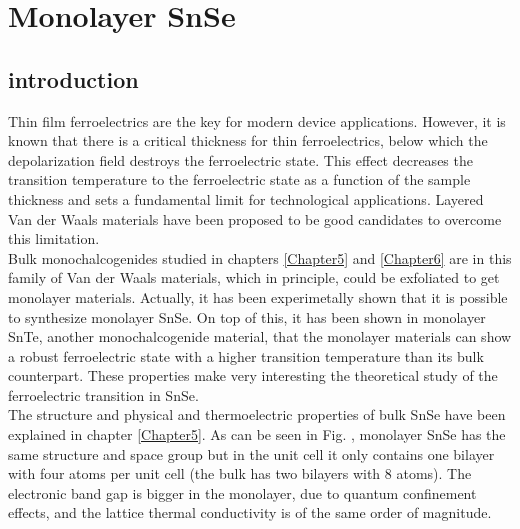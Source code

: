 
\chapter{Monolayer SnSe} %

\label{Chapter7} %




\section{introduction}

Thin film ferroelectrics are the key for modern device applications\cite{lallart2011ferroelectrics}. However, it is 
known that there is a critical thickness for thin ferroelectrics, below which the depolarization field destroys the 
ferroelectric state\cite{batra1973new,zhong1994giant,dawber2005physics}. This effect decreases the transition 
temperature to the ferroelectric state as a function of the sample 
thickness\cite{fong2004ferroelectricity,fong2006stabilization} and sets a fundamental limit for technological  
applications. Layered Van der Waals materials have been proposed to be good candidates to overcome this 
limitation\cite{shirodkar2014emergence,fei2016ferroelectricity}. \\

Bulk monochalcogenides studied in chapters \ref{Chapter5} and \ref{Chapter6} are in this family of Van der Waals 
materials, which in principle, could be exfoliated to get monolayer materials. Actually, it has been experimetally 
shown that it is possible to synthesize monolayer SnSe\cite{li2013single,zhao2015controlled}. On top of this, it has 
been shown in monolayer SnTe, another monochalcogenide material, that the monolayer materials can show a robust 
ferroelectric state with a higher transition temperature than its bulk counterpart\cite{chang2016discovery}. These 
properties make very interesting the theoretical study of the ferroelectric transition in SnSe. \\

The structure and physical and thermoelectric properties of bulk SnSe have been explained in chapter \ref{Chapter5}. 
As can be seen in Fig. , monolayer SnSe has the same structure and space group but in the unit cell it only contains 
one bilayer with four atoms per unit cell (the bulk has two bilayers with 8 atoms). The electronic band gap is 
bigger in the monolayer\cite{wang2015thermoelectric,hu2017high}, due to quantum confinement effects, and the lattice 
thermal conductivity is of the same order of magnitude\cite{wang2015thermoelectric,hu2017high}.
